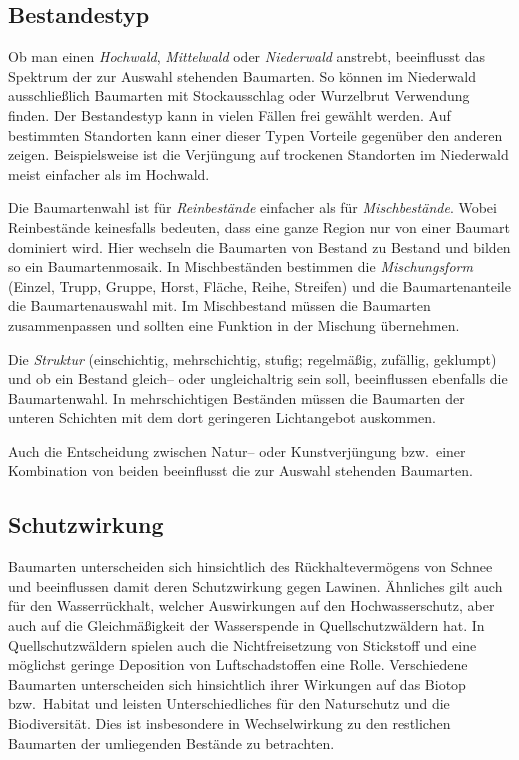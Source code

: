 \documentclass[twocolumn]{scrartcl}
\begin{document}
\subsection{Bestandestyp}
\label{ssec:bestandestyp}

Ob man einen \emph{Hochwald}, \emph{Mittelwald} oder \emph{Niederwald}
anstrebt, beeinflusst das Spektrum der zur Auswahl stehenden
Baumarten. So können im Niederwald ausschließlich Baumarten mit
Stockausschlag oder Wurzelbrut Verwendung finden. Der Bestandestyp
kann in vielen Fällen frei gewählt werden. Auf bestimmten Standorten
kann einer dieser Typen Vorteile gegenüber den anderen
zeigen. Beispielsweise ist die Verjüngung auf trockenen Standorten im
Niederwald meist einfacher als im Hochwald.

Die Baumartenwahl ist für \emph{Reinbestände} einfacher als für
\emph{Mischbestände}. Wobei Reinbestände keinesfalls bedeuten, dass eine ganze
Region nur von einer Baumart dominiert wird. Hier wechseln die Baumarten von
Bestand zu Bestand und bilden so ein Baumartenmosaik. In Mischbeständen
bestimmen die \emph{Mischungsform} (Einzel, Trupp, Gruppe, Horst, Fläche, Reihe,
Streifen) und die Baumartenanteile die Baumartenauswahl mit. Im Mischbestand
müssen die Baumarten zusammenpassen und sollten eine Funktion in der Mischung
übernehmen.

Die \emph{Struktur} (einschichtig, mehrschichtig, stufig; regelmäßig,
zufällig, geklumpt) und ob ein Bestand gleich-- oder ungleichaltrig
sein soll, beeinflussen ebenfalls die Baumartenwahl. In mehrschichtigen
Beständen müssen die Baumarten der unteren Schichten mit dem dort
geringeren Lichtangebot auskommen.

Auch die Entscheidung zwischen Natur-- oder Kunstverjüngung bzw.\
einer Kombination von beiden beeinflusst die zur Auswahl stehenden
Baumarten.

\subsection{Schutzwirkung}
\label{ssec:schutz}

Baumarten unterscheiden sich hinsichtlich des Rückhaltevermögens von
Schnee und beeinflussen damit deren Schutzwirkung gegen
Lawinen. Ähnliches gilt auch für den Wasserrückhalt, welcher
Auswirkungen auf den Hochwasserschutz, aber auch auf die
Gleichmäßigkeit der Wasserspende in Quellschutzwäldern hat. In
Quellschutzwäldern spielen auch die Nichtfreisetzung von Stickstoff und
eine möglichst geringe Deposition von Luftschadstoffen eine Rolle.
Verschiedene Baumarten unterscheiden sich hinsichtlich ihrer
Wirkungen auf das Biotop bzw.\ Habitat und leisten Unterschiedliches
für den Naturschutz und die Biodiversität. Dies ist insbesondere in
Wechselwirkung zu den restlichen Baumarten der umliegenden Bestände
zu betrachten.
\end{document}
